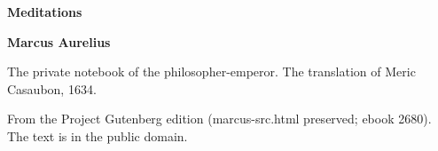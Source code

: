 \documentclass[11pt,letterpaper]{article}
\begin{document}
\color{ink}

\begin{titlepage}
\centering
\vspace*{4em}
{\LARGE\bfseries\color{heading} Meditations\par}
\vspace{2em}
{\Large\bfseries\color{heading} Marcus Aurelius\par}
\vspace{2.5em}
{\itshape\color{subhead}\parbox{0.8\linewidth}{\centering The private notebook of the philosopher-emperor. The translation of Meric Casaubon, 1634.\par}}
\vfill
{\small From the Project Gutenberg edition (marcus-src.html preserved; ebook 2680). The text is in the public domain.\par}
\vspace{2em}
\end{titlepage}

\tableofcontents


\end{document}
